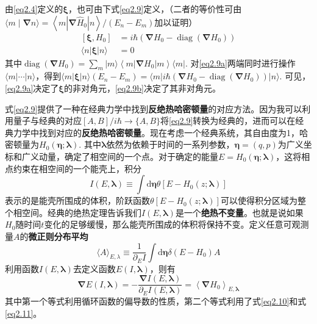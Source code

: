 由\ref{eq2.4}定义的$\bm{\xi}$，也可由下式\ref{eq2.9}定义，（二者的等价性可由$\langle m \mid \boldsymbol{\nabla} n\rangle=\left\langle m\left|\boldsymbol{\nabla} \hat{H}_{0}\right| n\right\rangle /\left(E_{n}-E_{m}\right)$\cite{Berry2009}加以证明）
\begin{subequations}
    \begin{align}
        \left[ \boldsymbol{\xi}, H_{0} \right] &= i \hbar \left( \boldsymbol{\nabla} H_{0}-\operatorname{diag} \left(\boldsymbol{\nabla} H_{0} \right) \right) \label{eq2.9a}\\
        \langle n|\boldsymbol{\xi}| n\rangle &= 0 \label{eq2.9b}
    \end{align}
    \label{eq2.9}
\end{subequations}
其中$\operatorname{diag}\left(\boldsymbol{\nabla} H_{0}\right)=\sum_{m}|m\rangle\left\langle m\left|\boldsymbol{\nabla} H_{0}\right| m\right\rangle\langle m|.$ 对\ref{eq2.9a}两端同时进行操作$\langle m|\cdots| n\rangle$，得到$\langle m| \boldsymbol{\xi} | n\rangle (E_n - E_m) = \langle m|i \hbar \left( \boldsymbol{\nabla} H_{0}-\operatorname{diag} \left(\boldsymbol{\nabla} H_{0} \right) \right)| n\rangle$. 可见，\ref{eq2.9a}决定了$\boldsymbol{\xi}$的非对角元，\ref{eq2.9b}决定了其非对角元。

式\ref{eq2.9}提供了一种在经典力学中找到\textbf{反绝热哈密顿量}的对应方法。因为我可以利用量子与经典的对应$[A, B]/i \hbar \to \{A, B\}  $将\ref{eq2.9}转换为经典的，进而可以在经典力学中找到对应的\textbf{反绝热哈密顿量}。现在考虑一个经典系统，其自由度为1，哈密顿量为$H_0 (\bm{\eta};\bm{\lambda}).$ 其中$\bm{\lambda}$依然为依赖于时间的一系列参数，$\bm{\eta}=(q,p)$为广义坐标和广义动量，确定了相空间的一个点。对于确定的能量$E = H_0 (\bm{\eta};\bm{\lambda})$，这将相点约束在相空间的一个能壳上，积分
\begin{equation}
    I(E, \boldsymbol{\lambda}) \equiv \int \mathrm{d} \bm{\eta} \theta\left[E-H_{0}(z ; \boldsymbol{\lambda})\right]
  \label{eq2.10}
\end{equation}
表示的是能壳所围成的体积，阶跃函数$\theta\left[E-H_{0}(z ; \boldsymbol{\lambda})\right]$可以使得积分区域为整个相空间。经典的绝热定理告诉我们$I(E, \boldsymbol{\lambda})$是一个\textbf{绝热不变量}\cite{LiuChuan2019}。也就是说如果$H_0$随时间$t$变化的足够缓慢，那么能壳所围成的体积将保持不变。定义任意可观测量$A$的\textbf{微正则分布平均}
\begin{equation}
    \langle A \rangle_{E, \lambda} \equiv \frac{1}{\partial_{E} I} \int \mathrm{d} \bm{\eta} \delta\left(E-H_{0}\right) A
  \label{eq2.11}
\end{equation}
利用函数$I (E,\bm{\lambda})$去定义函数$E (I, \bm{\lambda})$，则有
\begin{equation}
    \boldsymbol{\nabla} E(I, \boldsymbol{\lambda})=-\frac{\boldsymbol{\nabla} I(E, \boldsymbol{\lambda})}{\partial_{E} I(E, \boldsymbol{\lambda})}=\left\langle\boldsymbol{\nabla} H_{0}\right\rangle_{E, \boldsymbol{\lambda}}
  \label{eq2.12}
\end{equation}
其中第一个等式利用循环函数的偏导数的性质，第二个等式利用了式\ref{eq2.10}和式\ref{eq2.11}。


